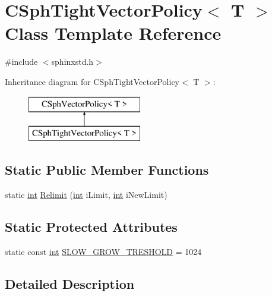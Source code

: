 \hypertarget{classCSphTightVectorPolicy}{\section{C\-Sph\-Tight\-Vector\-Policy$<$ T $>$ Class Template Reference}
\label{classCSphTightVectorPolicy}
}


{\ttfamily \#include $<$sphinxstd.\-h$>$}

Inheritance diagram for C\-Sph\-Tight\-Vector\-Policy$<$ T $>$\-:\begin{figure}[H]
\begin{center}
\leavevmode
\includegraphics[height=2.000000cm]{classCSphTightVectorPolicy}
\end{center}
\end{figure}
\subsection*{Static Public Member Functions}
\begin{DoxyCompactItemize}
\item 
static \hyperlink{sphinxexpr_8cpp_a4a26e8f9cb8b736e0c4cbf4d16de985e}{int} \hyperlink{classCSphTightVectorPolicy_ae458bab82d48e900c023ccd53d5ce5f9}{Relimit} (\hyperlink{sphinxexpr_8cpp_a4a26e8f9cb8b736e0c4cbf4d16de985e}{int} i\-Limit, \hyperlink{sphinxexpr_8cpp_a4a26e8f9cb8b736e0c4cbf4d16de985e}{int} i\-New\-Limit)
\end{DoxyCompactItemize}
\subsection*{Static Protected Attributes}
\begin{DoxyCompactItemize}
\item 
static const \hyperlink{sphinxexpr_8cpp_a4a26e8f9cb8b736e0c4cbf4d16de985e}{int} \hyperlink{classCSphTightVectorPolicy_ae664706ce38e831a03df1144071b4e93}{S\-L\-O\-W\-\_\-\-G\-R\-O\-W\-\_\-\-T\-R\-E\-S\-H\-O\-L\-D} = 1024
\end{DoxyCompactItemize}


\subsection{Detailed Description}
